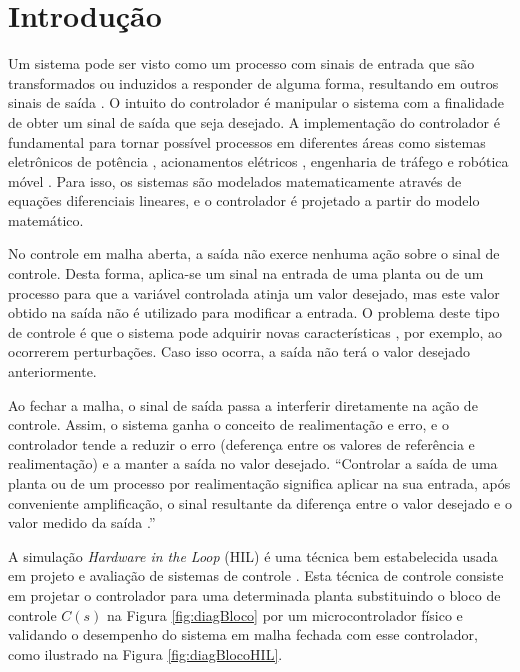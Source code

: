 \chapter{Introdução}

Um sistema pode ser visto como um processo com sinais de entrada que são 
transformados ou induzidos a responder de alguma forma, resultando em outros 
sinais de saída \cite{Oppenhein}. O intuito do controlador é manipular o sistema com a 
finalidade de obter um sinal de saída que seja desejado. A implementação do 
controlador é fundamental para tornar possível processos em diferentes áreas como 
sistemas eletrônicos de potência \cite{Rothstein}, acionamentos elétricos 
\cite{Bouscayrol}, engenharia de tráfego \cite{Bullock} e robótica móvel 
\cite{Kamali}. Para isso, os sistemas são modelados matematicamente através de 
equações diferenciais lineares, e o controlador é projetado a partir do modelo 
matemático.

No controle em malha aberta, a saída não exerce nenhuma ação sobre o sinal de 
controle. Desta forma, aplica-se um sinal na entrada de uma planta ou de um 
processo para que a variável controlada atinja um valor desejado, mas este 
valor obtido na saída não é utilizado para modificar a entrada. O problema 
deste tipo de controle é que o sistema pode adquirir novas características 
, por exemplo, ao ocorrerem perturbações. Caso isso ocorra, a saída não 
terá o valor desejado anteriormente.

Ao fechar a malha, o sinal de saída passa a interferir diretamente na ação de 
controle. Assim, o sistema ganha o conceito de realimentação e erro, 
e o controlador tende a reduzir o erro (deferença entre os valores de referência 
e realimentação) e a manter a saída no valor desejado. ``Controlar a saída de 
uma planta ou de um processo por realimentação significa aplicar na sua entrada, 
após conveniente amplificação, o sinal resultante da 
diferença entre o valor desejado e o valor medido da saída \cite[p.~3]{Castrucci}.''

A simulação \emph{Hardware in the Loop} (HIL) é uma técnica bem estabelecida 
usada em projeto e avaliação de sistemas de controle \cite{Bacic}. Esta técnica de 
controle consiste em projetar o controlador para uma determinada planta 
substituindo o bloco de controle $C(s)$ na Figura \ref{fig:diagBloco} por um 
microcontrolador físico e validando o desempenho do sistema em malha fechada com 
esse controlador, como ilustrado na Figura \ref{fig:diagBlocoHIL}.


